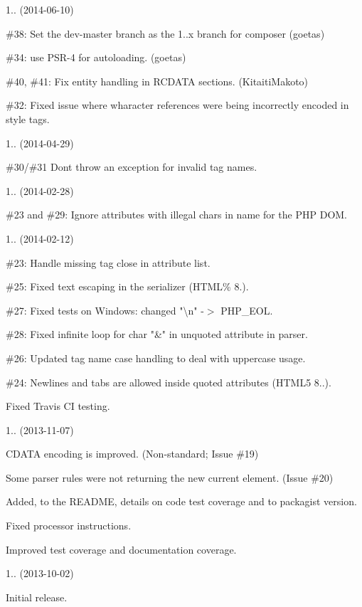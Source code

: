 1.. (2014-\/06-\/10)
\begin{DoxyItemize}
\item \#38\+: Set the dev-\/master branch as the 1..\+x branch for composer (goetas)
\item \#34\+:  use PSR-\/4 for autoloading. (goetas)
\item \#40, \#41\+: Fix entity handling in RCDATA sections. (Kitaiti\+Makoto)
\item \#32\+: Fixed issue where wharacter references were being incorrectly encoded in style tags.
\end{DoxyItemize}

1.. (2014-\/04-\/29)
\begin{DoxyItemize}
\item \#30/\#31 Don\textquotesingle{}t throw an exception for invalid tag names.
\end{DoxyItemize}

1.. (2014-\/02-\/28)
\begin{DoxyItemize}
\item \#23 and \#29\+: Ignore attributes with illegal chars in name for the PHP DOM.
\end{DoxyItemize}

1.. (2014-\/02-\/12)
\begin{DoxyItemize}
\item \#23\+: Handle missing tag close in attribute list.
\item \#25\+: Fixed text escaping in the serializer (HTML\% 8.).
\item \#27\+: Fixed tests on Windows\+: changed "{}\textbackslash{}n"{} -\/\texorpdfstring{$>$}{>} PHP\+\_\+\+EOL.
\item \#28\+: Fixed infinite loop for char "{}\&"{} in unquoted attribute in parser.
\item \#26\+: Updated tag name case handling to deal with uppercase usage.
\item \#24\+: Newlines and tabs are allowed inside quoted attributes (HTML5 8..).
\item Fixed Travis CI testing.
\end{DoxyItemize}

1.. (2013-\/11-\/07)
\begin{DoxyItemize}
\item CDATA encoding is improved. (Non-\/standard; Issue \#19)
\item Some parser rules were not returning the new current element. (Issue \#20)
\item Added, to the README, details on code test coverage and to packagist version.
\item Fixed processor instructions.
\item Improved test coverage and documentation coverage.
\end{DoxyItemize}

1.. (2013-\/10-\/02)
\begin{DoxyItemize}
\item Initial release. 
\end{DoxyItemize}